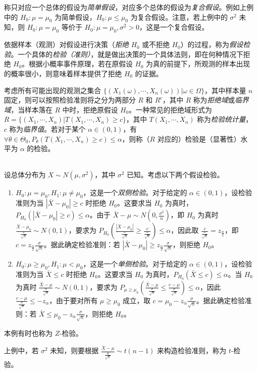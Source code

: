 \documentclass[../main.tex]{subfiles}
\begin{document}
称只对应一个总体的假设为\emph{简单假设}，对应多个总体的假设为\emph{复合假设}。例如上例中的 $H_0:\mu=\mu_0$ 为简单假设，$H_0:\mu\leq\mu_0$ 为复合假设。注意，若上例中的 $\sigma^2$ 未知，则 $H_0:\mu=\mu_0$ 等价于 $H_0:\mu=\mu_0,\sigma^2>0$，这是一个复合假设。

依据样本（观测）对假设进行决策（\emph{拒绝} $H_0$ 或不拒绝 $H_0$）的过程，称为\emph{假设检验}。一个具体的\emph{检验（准则）}，就是做出决策的一个具体法则，即在何种情况下拒绝 $H_0$。根据小概率事件原理，若在原假设 $H_0$ 为真的前提下，所观测的样本出现的概率很小，则意味着样本提供了拒绝 $H_0$ 的证据。

考虑所有可能出现的观测之集合 $\{(X_1(\omega),\cdots,X_n(\omega))|\omega\in\Omega\}$，其中样本量 $n$ 固定，则可以按照检验准则将之分为两部分 $R$ 和 $R^c$，其中 $R$ 称为\emph{拒绝域}或\emph{临界域}，当样本落在 $R$ 中时，拒绝原假设 $H_0$。一种常见的拒绝域形式为 $R=\{(X_1,\cdots,X_n)|T(X_1,\cdots,X_n)\geq c\}$，其中 $T(X_1,\cdots,X_n)$ 称为\emph{检验统计量}，$c$ 称为\emph{临界值}。若对于某个 $\alpha\in(0,1)$，有 $\forall\theta\in\Theta_0,P_\theta(T(X_1,\cdots,X_n)\geq c)\leq\alpha$，则称（$R$ 对应的）检验是（显著性）水平为 $\alpha$ 的检验。

\begin{example}
    \mbox{}\\
    设总体分布为 $X\sim N(\mu,\sigma^2)$，其中 $\sigma^2$ 已知。考虑以下两个假设检验。
    \begin{enumerate}
        \item $H_0:\mu=\mu_0,H_1:\mu\neq\mu_0$，这是一个\emph{双侧检验}。对于给定的 $\alpha\in(0,1)$，设检验准则为当 $|\bar X-\mu_0|\geq c$ 时拒绝 $H_0$。这要求当 $H_0$ 为真时，$P_{H_0}(|\bar X-\mu_0|\geq c)\leq\alpha$。由于 $\bar X-\mu\sim N(0,\frac{\sigma^2}n)$，即 $H_0$ 为真时 $\frac{\bar X-\mu_0}{\frac\sigma{\sqrt n}}\sim N(0,1)$，要求为 $P_{H_0}(\frac{|\bar X-\mu_0|}{\frac\sigma{\sqrt n}}\geq\frac c{\frac\sigma{\sqrt n}})\leq\alpha$，因此取 $\frac c{\frac{\sigma}{\sqrt n}}=z_{\frac\alpha 2}$，即 $c=z_{\frac\alpha 2}\frac\sigma{\sqrt n}$。据此确定检验准则：若 $|\bar X-\mu_0|\geq z_{\frac\alpha 2}\frac\sigma{\sqrt n}$，则拒绝 $H_0$。
        \item $H_0:\mu\geq\mu_0,H_1:\mu<\mu_0$，这是一个\emph{单侧检验}。对于给定的 $\alpha\in(0,1)$，设检验准则为当 $\bar X\leq c$ 时拒绝 $H_0$。这要求当 $H_0$ 为真时，$P_{H_0}(\bar X\leq c)\leq\alpha$。当 $H_0$ 为真时 $\frac{\bar X-\mu}{\frac\sigma{\sqrt n}}\sim N(0,1)$，要求为 $P_{\mu\geq\mu_0}(\frac{\bar X-\mu}{\frac\sigma{\sqrt n}}\leq\frac{c-\mu}{\frac\sigma{\sqrt n}})\leq\alpha$，因此 $\frac{c-\mu}{\frac{\sigma}{\sqrt n}}\leq-z_\alpha$，由于要对所有 $\mu\geq\mu_0$ 成立，取 $c=\mu_0-z_\alpha\frac\sigma{\sqrt n}$。据此确定检验准则：若 $\bar X\leq\mu_0-z_\alpha\frac\sigma{\sqrt n}$，则拒绝 $H_0$。
    \end{enumerate}
    本例有时也称为 $Z$-检验。
\end{example}

上例中，若 $\sigma^2$ 未知，则要根据 $\frac{\bar X-\mu}{\frac S{\sqrt n}}\sim t(n-1)$ 来构造检验准则，称为 $t$-检验。
\end{document}
